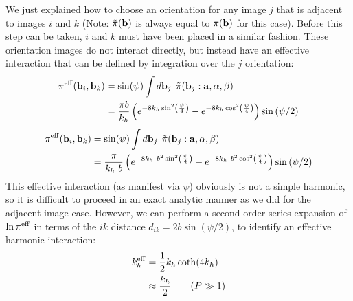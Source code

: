         We just explained how to choose an orientation for any image $j$ that is adjacent to images $i$ and $k$ (Note: $\tilde \pi ({\mathbf {b}})$ is always equal to $\pi ({\mathbf {b}})$ for this case). Before this step can be taken, $i$ and $k$ must have been placed in a similar fashion. These orientation images do not interact directly, but instead have an effective interaction that can be defined by integration over the $j$ orientation:
        \ifkhExplicitP
            \begin{equation}
            \label{eq:piEff}
                \begin{aligned}
                    \pi^{\rm eff}({\mathbf {b}}_i,{\mathbf {b}}_k)&= \sin(\psi)\int d{\mathbf {b}}_j \: \: \tilde \pi({\mathbf {b}}_j: \mathbf{a}, \alpha, \beta) \nonumber \\
                    &=\frac{\pi b}{k_h}\left( e^{ - 8 k_h \sin^2 \left( \frac{\psi}{4}\right)} - e^{ - 8 k_h \cos^2 \left( \frac{\psi}{4} \right)} \right) \sin \left(\psi /2 \right)
                \end{aligned}
            \end{equation}
        \else
            \begin{equation}
            \label{eq:piEff}
                \begin{aligned}
                    \pi^{\rm eff}({\mathbf {b}}_i,{\mathbf {b}}_k)&= \sin(\psi)\int d{\mathbf {b}}_j \: \: \tilde \pi({\mathbf {b}}_j: \mathbf{a}, \alpha, \beta) \nonumber \\
                    &=\frac{\pi}{k_h~b}\left( e^{ - 8 k_h~b^2 \sin^2 \left( \frac{\psi}{4}\right)} - e^{ - 8 k_h~b^2 \cos^2 \left( \frac{\psi}{4} \right)} \right) \sin \left(\psi /2 \right)
                \end{aligned}
            \end{equation}
        \fi
        This effective interaction (as manifest via $\psi$) obviously is not a simple harmonic, so  it is difficult to proceed in an exact analytic manner as we did for the adjacent-image case. However, we can perform a second-order series expansion of $\ln \pi^{\rm eff}$ in terms of the $ik$ distance $d_{ik} = 2b\sin(\psi/2)$, to identify an effective harmonic interaction:
        \begin{equation}
            \begin{aligned}
                k_h^{\rm eff} &= \frac{1}{2}k_h\coth(4 k_h)\\
                &\approx \frac{k_h}{2} \qquad (P \gg 1)\nonumber
            \end{aligned}
        \end{equation}
